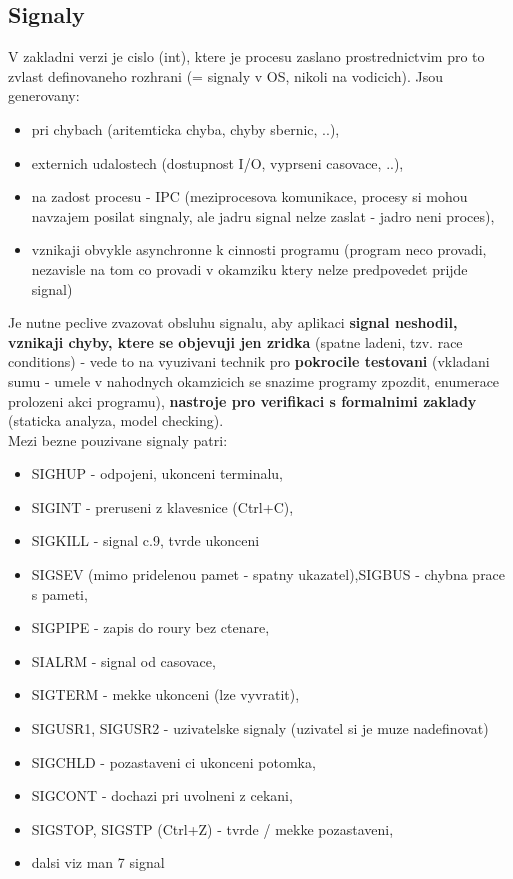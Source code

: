 \documentclass[a4paper, 11pt]{article}
\begin{document}
\subsection{Signaly}
V zakladni verzi je cislo (int), ktere je procesu zaslano prostrednictvim pro to zvlast definovaneho rozhrani (= signaly v OS, nikoli na vodicich). Jsou generovany:
\begin{itemize}
    \item pri chybach (aritemticka chyba, chyby sbernic, ..),
    \item externich udalostech (dostupnost I/O, vyprseni casovace, ..),
    \item na zadost procesu - IPC (meziprocesova komunikace, procesy si mohou navzajem posilat singnaly, ale jadru signal nelze zaslat - jadro neni proces),
    \item vznikaji obvykle asynchronne k cinnosti programu (program neco provadi, nezavisle na tom co provadi v okamziku ktery nelze predpovedet prijde signal) \\
\end{itemize}

Je nutne peclive zvazovat obsluhu signalu, aby aplikaci \textbf{signal neshodil, vznikaji chyby, ktere se objevuji jen zridka} (spatne ladeni, tzv. race conditions) - vede to na vyuzivani technik pro \textbf{pokrocile testovani} (vkladani sumu - umele v nahodnych okamzicich se snazime programy zpozdit, enumerace prolozeni akci programu), \textbf{nastroje pro verifikaci s formalnimi zaklady} (staticka analyza, model checking). \\

Mezi bezne pouzivane signaly patri:
\begin{itemize}
    \item SIGHUP - odpojeni, ukonceni terminalu,
    \item SIGINT - preruseni z klavesnice (Ctrl+C),
    \item SIGKILL - signal c.9, tvrde ukonceni
    \item SIGSEV (mimo pridelenou pamet - spatny ukazatel),SIGBUS - chybna prace s pameti,
    \item SIGPIPE - zapis do roury bez ctenare,
    \item SIALRM - signal od casovace,
    \item SIGTERM - mekke ukonceni (lze vyvratit),
    \item SIGUSR1, SIGUSR2 - uzivatelske signaly (uzivatel si je muze nadefinovat)
    \item SIGCHLD - pozastaveni ci ukonceni potomka,
    \item SIGCONT - dochazi pri uvolneni z cekani,
    \item SIGSTOP, SIGSTP (Ctrl+Z) - tvrde / mekke pozastaveni,
    \item dalsi viz man 7 signal \\
\end{itemize}
\end{document}
